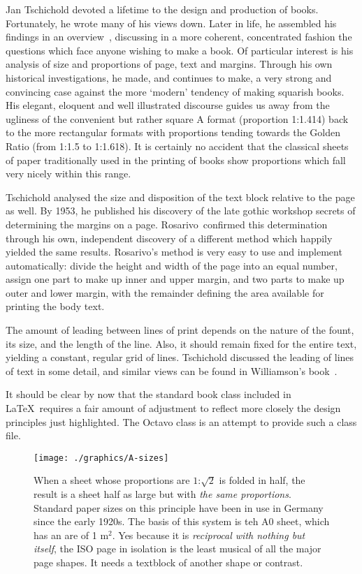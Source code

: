  Jan Tschichold devoted a lifetime to the design and production of books. 
 Fortunately, he wrote many of his views down. Later in life, he assembled 
 his findings in an overview~\cite{tschichold87}, discussing in a more
 coherent, concentrated fashion the questions which face anyone wishing to
 make a book. Of particular interest is his analysis of size and proportions of
 page, text and margins. Through his own historical investigations, he made, 
 and continues to make, a very strong and convincing case against the more
 `modern' tendency of making squarish books. His elegant, eloquent and well
 illustrated discourse guides us away from the ugliness of the convenient but
 rather square A format (proportion 1:1.414) back to the more rectangular
 formats with  proportions tending towards the Golden  Ratio (from 1:1.5 to
 1:1.618). It is certainly no accident that the classical sheets of paper
 traditionally used in the printing of books show proportions which fall very
 nicely within this range. 

 Tschichold analysed the size and disposition of the text block relative
 to the page as well. By 1953, he published his discovery of the late gothic 
 workshop secrets of determining the margins on a page.
 Rosarivo~\cite{rosarivo61}confirmed this determination through his own, 
 independent discovery of a different method which happily yielded the same 
 results. Rosarivo's method is very easy to use and implement automatically:
 divide the height and width of the page into an equal number, assign one part
 to make up inner and upper margin, and two parts to make up outer and lower
 margin, with the remainder defining the area available for printing the body
 text.

 The amount of leading between lines of print depends on the nature of the
 fount, its size, and the length of the line. Also, it should remain fixed for
 the entire text, yielding a constant, regular grid of lines. Tschichold
 discussed the leading of lines of text in some detail, and similar views can 
 be found in Williamson's book~\cite{williamson66}.

 It should be clear by now that the standard book class included in \LaTeX\
 requires a fair amount of adjustment to reflect more closely the design
 principles just highlighted. The Octavo class is an attempt to provide
 such a class file.

\begin{figure}
\centering
  \texttt{[image: ./graphics/A-sizes]}
  \caption{When a sheet whose proportions are $1$:$\surd{2}$ is folded in half, the result is a sheet half as large but with \emph{the same proportions}. Standard paper sizes on this principle have been in use in Germany since the early 1920s. The basis of this system is teh A0 sheet, which has an are of 1 m$^2$. Yes because it is \textit{reciprocal with nothing but itself}, the ISO page in isolation is the least musical of all the major page shapes. It needs a textblock of another shape or contrast.}
   \label{fig:marginfig1}
\end{figure}

